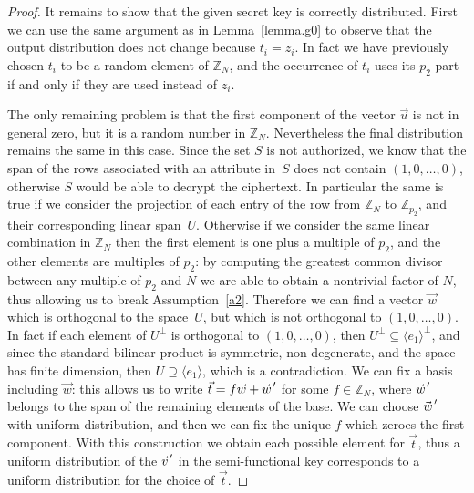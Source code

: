 \documentclass[a4paper,10pt]{article}
\newcommand{\Z}{\mathbb{Z}}
\newcommand{\pvec}[2][]{{\hspace{-0.05em}\vec{\hspace{0.05em}#2}\mkern2mu\vphantom{#2}}^\prime_{\hspace{-0.18em}#1}}
\begin{document}
\begin{proof}
		It remains to show that the given secret key is correctly distributed.
		First we can use the same argument as in Lemma~\ref{lemma.g0} to observe that the output distribution does not change because $t_i=z_i$. In fact we have previously chosen $t_i$ to be a random element of $\Z_N$, and the occurrence of $t_i$ uses its $p_2$ part if and only if they are used instead of $z_i$.
		
		The only remaining problem is that the first component of the vector $\vec{u}$ is not in general zero, but it is a random number in $\Z_N$. Nevertheless the final distribution remains the same in this case. 
Since the set $S$ is not authorized, we know that the span of the rows associated with an attribute in~$S$ does not contain $(1,0,\ldots,0)$, otherwise $S$ would be able to decrypt the ciphertext.
		In particular the same is true if we consider the projection of each entry of the row from $\Z_N$ to $\Z_{p_2}$, and their corresponding linear span~$U$. Otherwise if we consider the same linear combination in $\Z_N$ then the first element is one plus a multiple of $p_2$, and the other elements are multiples of $p_2$: by computing the greatest common divisor between any multiple of $p_2$ and $N$ we are able to obtain a nontrivial factor of $N$, thus allowing us to break Assumption~\ref{a2}.
		Therefore we can find a vector $\vec{w}$ which is orthogonal to the space~$U$, but which is not orthogonal to $(1,0,\ldots,0)$. In fact if each element of $U^\perp$ is orthogonal to $(1,0,\ldots,0)$, then $U^\perp \subseteq\langle e_1\rangle^\perp$, and since the standard bilinear product is symmetric, non-degenerate, and the space has finite dimension, then $U \supseteq\langle e_1\rangle$, which is a contradiction. We can fix a basis including $\vec{w}$: this allows us to write $\vec{t}=f\vec{w}+\pvec{w}$ for some $f\in\Z_N$, where $\pvec{w}$ belongs to the span of the remaining elements of the base. We can choose $\pvec{w}$ with uniform distribution, and then we can fix the unique $f$ which zeroes the first component.
		 With this construction we obtain each possible element for $\vec{t}$, thus a uniform distribution of the $\pvec{v}$ in the semi-functional key corresponds to a uniform distribution for the choice of $\vec{t}$. 
		

\end{proof}
\end{document}
